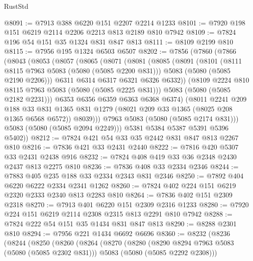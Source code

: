 \begin{lexlean}{RustStd}
\begin{coremodule}
{\begin{coremodule}
{{{{{@8091 := @7913 @388 @6220 @151 @2207 @2214 @1233
@8101 := @7920 @198 @151 @6219 @2114 @2206 @2213 @813 @2189 @810 @7942
@8109 := @7824 @196 @54 @151 @35 @1324 @831 @847 @813
@8111 := @8109 @2199 @810
@8115 := @7956 @195 @1324 @6503 @6507
@8202 := @7856
    (@7860
      (@7866
        (@8043
          (@8053
            (@8057
              (@8065
                (@8071
                  (@8081
                    (@8085
                      (@8091
                        (@8101
                          (@8111 @8115 @7963 @5083 (@5080 (@5085 @2200 @831)))
                          @5083
                          (@5080 (@5085 @2190 @2206)))
                        @6311
                        @6314
                        @6317
                        @6321
                        @6326
                        @6332))
                    (@8109 @2224 @810 @8115 @7963 @5083 (@5080 (@5085 @2225 @831)))
                    @5083
                    (@5080 (@5085 @2182 @2231)))
                  @6353
                  @6356
                  @6359
                  @6363
                  @6368
                  @6374)
                (@8011
                  @2241
                  @209
                  @188
                  @33
                  @831
                  @1365
                  @831
                  @1279
                  (@8021 @209 @33 @1365 (@8025 @208 @1365 @6568 @6572))
                  @8039)))
            @7963
            @5083
            (@5080 (@5085 @2174 @831)))
          @5083
          (@5080 (@5085 @2094 @2249)))
        @5381
        @5384
        @5387
        @5391
        @5396
        @5402))
@8212 := @7824 @421 @54 @33 @35 @2442 @831 @847 @813 @2267 @810
@8216 := @7836 @421 @33 @2431 @2440
@8222 := @7816 @420 @5307 @33 @2431 @2438 @916
@8232 := @7824 @408 @419 @33 @36 @2348 @2430 @2437 @813 @2275 @810
@8236 := @7836 @408 @33 @2334 @2346
@8244 := @7883 @405 @235 @188 @33 @2334 @2343 @831 @2346
@8250 := @7892 @404 @6220 @6222 @2334 @2341 @1262
@8260 := @7824 @402 @224 @151 @6219 @2320 @2333 @2340 @813 @2283 @810
@8264 := @7836 @402 @151 @2309 @2318
@8270 := @7913 @401 @6220 @151 @2309 @2316 @1233
@8280 := @7920 @224 @151 @6219 @2114 @2308 @2315 @813 @2291 @810 @7942
@8288 := @7824 @222 @54 @151 @35 @1434 @831 @847 @813
@8290 := @8288 @2301 @810
@8294 := @7956 @221 @1434 @6692 @6696
@8360 := @8232
    (@8236
      (@8244
        (@8250
          (@8260
            (@8264
              (@8270
                (@8280
                  (@8290 @8294 @7963 @5083 (@5080 (@5085 @2302 @831)))
                  @5083
                  (@5080 (@5085 @2292 @2308)))
}}}}}
\end{coremodule}}
\end{coremodule}
\end{lexlean}
